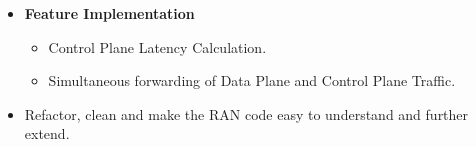 \begin{itemize}
	\item \textbf{Feature Implementation} 
	\begin{itemize}
		\item Control Plane Latency Calculation.
		\item Simultaneous forwarding of Data Plane and Control Plane Traffic.
	\end{itemize}
	\item Refactor, clean and make the RAN code easy to understand and further extend.
\end{itemize}
%
